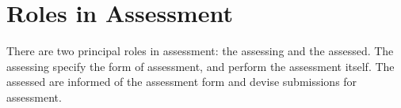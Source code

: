 
\section{Roles in Assessment}

There are two principal roles in assessment: the assessing and the assessed.
The assessing specify the form of assessment, and perform the assessment
itself. The assessed are informed of the assessment form and devise submissions
for assessment.

